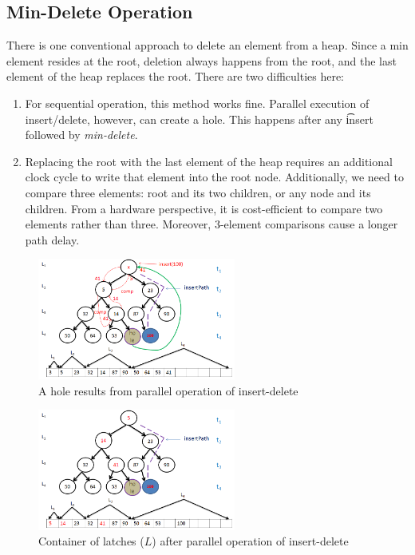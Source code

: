 \subsection{Min-Delete Operation}

There is one conventional approach to delete an element from a heap.
Since a min element resides at the root, deletion always happens from the root, and the last element of the heap replaces the root.
There are two difficulties here:

\begin{enumerate}
\item For sequential operation, this method works fine. Parallel execution of insert/delete, however, can create a hole. This happens after any {\t insert} followed by {\it min-delete}.
\item Replacing the root with the last element of the heap requires an additional clock cycle to write that element into the root node. Additionally, we need to compare three elements: root and its two children, or any node and its children. From a hardware perspective, it is cost-efficient to compare two elements rather than three. Moreover, 3-element comparisons cause a longer path delay.
\end{enumerate}


\begin{figure}[!ht]
  \centering
  \includegraphics[width=6.5cm]{fig/8.png}
      \caption{A hole results from parallel operation of insert-delete}
    \label{fig8}
\end{figure}

\begin{figure}[!ht]
  \centering
  \includegraphics[width=6.5cm]{fig/9.png}
      \caption{Container of latches ($L$) after parallel operation of insert-delete}
    \label{fig9}
\end{figure}

